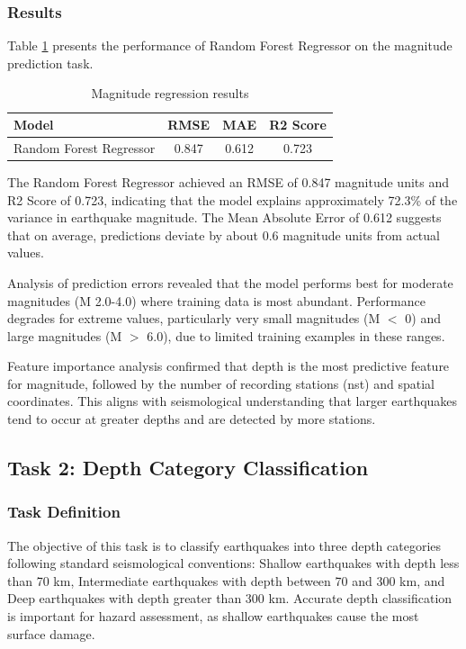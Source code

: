 \subsubsection{Results}

Table \ref{tab:regression_results} presents the performance of Random Forest Regressor on the magnitude prediction task.

\begin{table}[H]
\centering
\caption{Magnitude regression results}
\label{tab:regression_results}
\begin{tabular}{|l|c|c|c|}
\hline
\textbf{Model} & \textbf{RMSE} & \textbf{MAE} & \textbf{R2 Score} \\
\hline
Random Forest Regressor & 0.847 & 0.612 & 0.723 \\
\hline
\end{tabular}
\end{table}

The Random Forest Regressor achieved an RMSE of 0.847 magnitude units and R2 Score of 0.723, indicating that the model explains approximately 72.3\% of the variance in earthquake magnitude. The Mean Absolute Error of 0.612 suggests that on average, predictions deviate by about 0.6 magnitude units from actual values.

Analysis of prediction errors revealed that the model performs best for moderate magnitudes (M 2.0-4.0) where training data is most abundant. Performance degrades for extreme values, particularly very small magnitudes (M $<$ 0) and large magnitudes (M $>$ 6.0), due to limited training examples in these ranges.

Feature importance analysis confirmed that depth is the most predictive feature for magnitude, followed by the number of recording stations (nst) and spatial coordinates. This aligns with seismological understanding that larger earthquakes tend to occur at greater depths and are detected by more stations.

\subsection{Task 2: Depth Category Classification}

\subsubsection{Task Definition}

The objective of this task is to classify earthquakes into three depth categories following standard seismological conventions: Shallow earthquakes with depth less than 70 km, Intermediate earthquakes with depth between 70 and 300 km, and Deep earthquakes with depth greater than 300 km. Accurate depth classification is important for hazard assessment, as shallow earthquakes cause the most surface damage.

